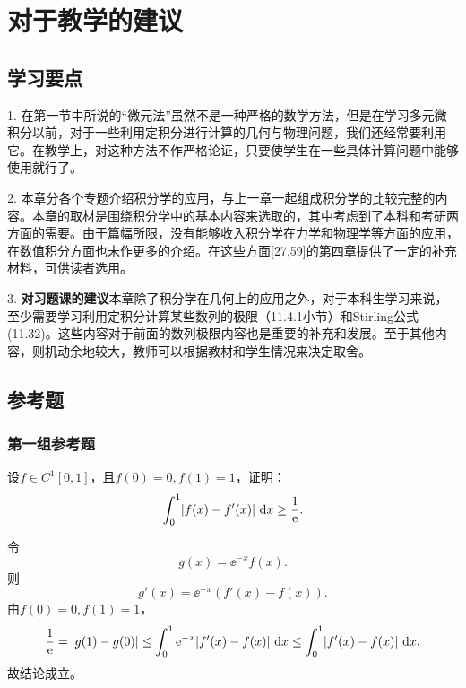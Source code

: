 \section{对于教学的建议}

\subsection{学习要点}

1. 在第一节中所说的“微元法”虽然不是一种严格的数学方法，但是在学习多元微积分以前，对于一些利用定积分进行计算的几何与物理问题，我们还经常要利用它。在教学上，对这种方法不作严格论证，只要使学生在一些具体计算问题中能够使用就行了。

2. 本章分各个专题介绍积分学的应用，与上一章一起组成积分学的比较完整的内容。本章的取材是围绕积分学中的基本内容来选取的，其中考虑到了本科和考研两方面的需要。由于篇幅所限，没有能够收入积分学在力学和物理学等方面的应用，在数值积分方面也未作更多的介绍。在这些方面[27,59]的第四章提供了一定的补充材料，可供读者选用。

3. \textbf{对习题课的建议}\quad 本章除了积分学在几何上的应用之外，对于本科生学习来说，至少需要学习利用定积分计算某些数列的极限（11.4.1小节）和Stirling公式(11.32)。这些内容对于前面的数列极限内容也是重要的补充和发展。至于其他内容，则机动余地较大，教师可以根据教材和学生情况来决定取舍。

\subsection{参考题}

\subsubsection*{第一组参考题}

\begin{xreferenceproblem}[1]
设$f\in C^1[0,1]$，且$f(0)=0,f(1)=1$，证明：
  \[
    \int_0^1\lvert f(x)-f'(x)\rvert\,\mathop{}\!\mathrm{d} x\ge\frac1{\mathrm{e}}.
  \]
\end{xreferenceproblem}
\begin{xsolution}
令
\[
 g(x)=\ee^{-x}f(x).
\]
则
\[
 g'(x)=\ee^{-x}(f'(x)-f(x)).
\]
由$f(0)=0,f(1)=1$，
\[
 \frac1{\mathrm{e}}=\lvert g(1)-g(0)\rvert
 \le\int_0^1\mathrm{e}^{-x}\lvert f'(x)-f(x)\rvert\,\mathop{}\!\mathrm{d} x
 \le\int_0^1\lvert f'(x)-f(x)\rvert\,\mathop{}\!\mathrm{d} x.
\]
故结论成立。
\end{xsolution}


